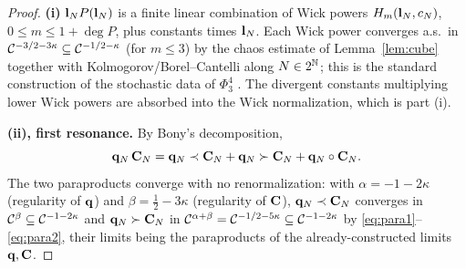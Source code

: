 \begin{proof}
\textbf{(i)} $\mathbf{l}_N P(\mathbf{l}_N)$ is a finite linear combination of Wick powers
$H_{m}(\mathbf{l}_N,c_N)$, $0\le m\le 1+\deg P$, plus constants times $\mathbf{l}_N$.
Each Wick power converges a.s.\ in $\mathcal{C}^{-3/2-3\kappa}\subseteq\mathcal{C}^{-1/2-\kappa}$
(for $m\le3$) by the chaos estimate of Lemma~\ref{lem:cube} together with
Kolmogorov/Borel--Cantelli along $N\in2^{\mathbb{N}}$; this is the standard construction of
the stochastic data of $\Phi^4_3$ \cite{CC18}. The divergent constants multiplying
lower Wick powers are absorbed into the Wick normalization, which is part (i).

\medskip
\textbf{(ii), first resonance.} By Bony's decomposition,
\begin{equation}\label{eq:bony1}
\mathbf{q}_N\,\mathbf{C}_N=\mathbf{q}_N\prec\mathbf{C}_N+\mathbf{q}_N\succ\mathbf{C}_N+\mathbf{q}_N\circ\mathbf{C}_N .
\end{equation}
The two paraproducts converge with no renormalization: with $\alpha=-1-2\kappa$
(regularity of $\mathbf{q}$) and $\beta=\tfrac12-3\kappa$ (regularity of $\mathbf{C}$),
$\mathbf{q}_N\prec\mathbf{C}_N$ converges in $\mathcal{C}^{\beta}\subseteq\mathcal{C}^{-1-2\kappa}$ and
$\mathbf{q}_N\succ\mathbf{C}_N$ in $\mathcal{C}^{\alpha+\beta}=\mathcal{C}^{-1/2-5\kappa}\subseteq\mathcal{C}^{-1-2\kappa}$
by \eqref{eq:para1}--\eqref{eq:para2}, their limits being the paraproducts of the
already-constructed limits $\mathbf{q},\mathbf{C}$.


\end{proof}
